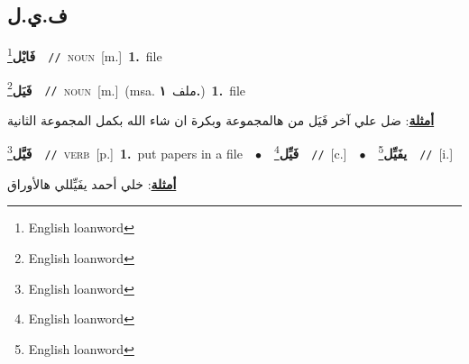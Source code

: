 \documentclass[10pt,a4paper,twoside]{article} %
\begin{document}
\begin{multicols}{2}
\vspace{-3mm}
\subsection*{\color{blue}\foreignlanguage{arabic}{ف.ي.ل}\color{blue}{ (ntws)}} 

{\setlength\topsep{0pt}\textbf{\foreignlanguage{arabic}{فَايْل}}\footnote{English loanword}\ \ {\color{gray}\texttt{//}\color{black}}\ \textsc{noun}\ [m.]\ \textbf{1.}~file\ } \vspace{2mm}

{\setlength\topsep{0pt}\textbf{\foreignlanguage{arabic}{فَيَل}}\footnote{English loanword}\ \ {\color{gray}\texttt{//}\color{black}}\ \textsc{noun}\ [m.]\ \color{gray}(msa. \foreignlanguage{arabic}{ملف}~\foreignlanguage{arabic}{\textbf{١.}})\color{black}\ \textbf{1.}~file\  \begin{flushright}\color{gray}\foreignlanguage{arabic}{\textbf{\underline{\foreignlanguage{arabic}{أمثلة}}}: ضل علي آخر فَيَل من هالمجموعة وبكرة ان شاء الله بكمل المجموعة الثانية}\end{flushright}\color{black}} \vspace{2mm}

{\setlength\topsep{0pt}\textbf{\foreignlanguage{arabic}{فَيَّل}}\footnote{English loanword}\ \ {\color{gray}\texttt{//}\color{black}}\ \textsc{verb}\ [p.]\ \textbf{1.}~put papers in a file\ \ $\bullet$\ \ \setlength\topsep{0pt}\textbf{\foreignlanguage{arabic}{فَيِّل}}\footnote{English loanword}\ \ {\color{gray}\texttt{//}\color{black}}\ [c.]\ \ $\bullet$\ \ \setlength\topsep{0pt}\textbf{\foreignlanguage{arabic}{يفَيِّل}}\footnote{English loanword}\ \ {\color{gray}\texttt{//}\color{black}}\ [i.]\  \begin{flushright}\color{gray}\foreignlanguage{arabic}{\textbf{\underline{\foreignlanguage{arabic}{أمثلة}}}: خلي أحمد يفَيِّللي هالأوراق}\end{flushright}\color{black}} \vspace{2mm}

\end{multicols}
\end{document}
